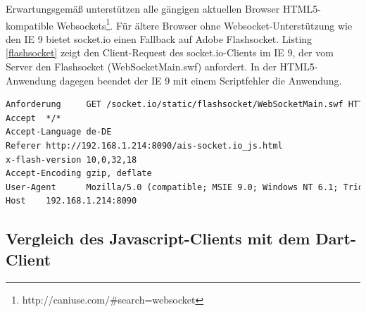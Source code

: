 Erwartungsgemäß unterstützen alle gängigen aktuellen Browser HTML5-kompatible Websockets\footnote{http://caniuse.com/\#search=websocket}. Für ältere Browser ohne Websocket-Unterstützung wie den IE 9 bietet socket.io einen Fallback auf Adobe Flashsocket. Listing \ref{flashsocket} zeigt den Client-Request des socket.io-Clients im IE 9, der vom Server den Flashsocket (WebSocketMain.swf) anfordert. In der HTML5-Anwendung dagegen beendet der IE 9  mit einem Scriptfehler die Anwendung.\\
\begin{lstlisting}[language=html,caption=socket.io Client-Request in Internet Explorer 9, label=flashsocket]
Anforderung     GET /socket.io/static/flashsocket/WebSocketMain.swf HTTP/1.1
Accept  */*
Accept-Language de-DE
Referer http://192.168.1.214:8090/ais-socket.io_js.html
x-flash-version 10,0,32,18
Accept-Encoding gzip, deflate
User-Agent      Mozilla/5.0 (compatible; MSIE 9.0; Windows NT 6.1; Trident/5.0)
Host    192.168.1.214:8090                            
\end{lstlisting}

\newpage
\subsection{Vergleich des Javascript-Clients mit dem Dart-Client} 
